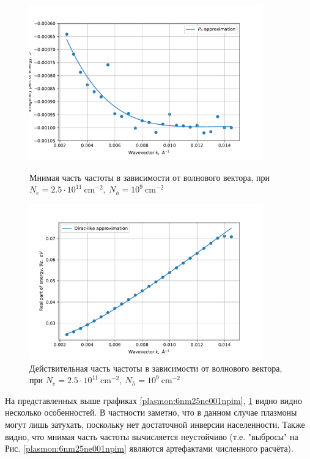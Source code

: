 \documentclass[../main.tex]{subfiles}
\begin{document}
    \begin{figure}[h]
        \begin{minipage}[h]{0.49\textwidth}
            \includegraphics[width=0.9\textwidth]{./images/plasmon_6nm_25_001_im.pdf}
            \caption{Мнимая часть частоты в зависимости от волнового вектора, при $N_e = 2.5 \cdot 10^{11}~\text{cm}^{-2},~N_h = 10^9~\text{cm}^{-2}$
            \label{plasmon:6nm25ne001npim}}
        \end{minipage}
        \hfill
        \begin{minipage}[h]{0.49\textwidth}
            \includegraphics[width=0.9\textwidth]{./images/plasmon_6nm_25_001_re.pdf}
            \caption{Действительная часть частоты в зависимости от волнового вектора, при $N_e = 2.5 \cdot 10^{11}~\text{cm}^{-2},~N_h = 10^9~\text{cm}^{-2}$
            \label{plasmon:6nm25ne001npre}}
        \end{minipage}
    \end{figure}

    На представленных выше графиках \ref{plasmon:6nm25ne001npim}, \ref{plasmon:6nm25ne001npre} видно видно несколько особенностей.
    В частности заметно, что в данном случае плазмоны могут лишь затухать, поскольку нет достаточной инверсии населенности. 
    Также видно, что мнимая часть частоты вычисляется неустойчиво (т.е. "выбросы" на Рис. \ref{plasmon:6nm25ne001npim} 
    являются артефактами численного расчёта).
\end{document}
